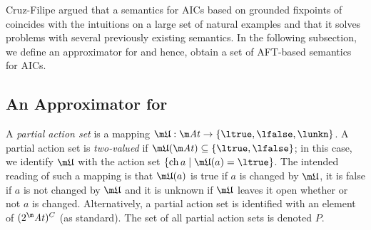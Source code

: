 Cruz-Filipe argued that a semantics for AICs based on grounded fixpoints of \Op coincides with the intuitions on a large set of natural examples and that it solves problems with several previously existing semantics. 
In the following subsection, we define an approximator for \Op and hence, obtain a set of AFT-based semantics for AICs. 



% 

\subsection{An Approximator for \Op}

A \emph{partial action set} is a mapping $\UUU:\atoms \to \{\ltrue,\lfalse,\lunkn\}$. A partial action set \UUU is \emph{two-valued} if $\UUU(\atoms)\subseteq\{\ltrue,\lfalse\}$; in this case, we identify $\UUU$ with the action set $\{\change a\mid \UUU(a)=\ltrue\}$. 
The intended reading of such a mapping is that $\UUU(a)$ is true if $a$ is changed by $\UUU$, it is false if $a$ is not changed by $\UUU$ and it is unknown if $\UUU$ leaves it open whether or not $a$ is changed. 
Alternatively, a partial action set is identified with an element of $(2^\atoms)^C$ (as standard). 
The set of all partial action sets is denoted $P$.

